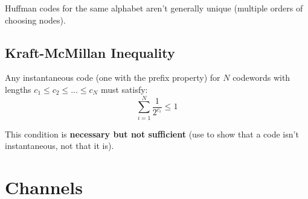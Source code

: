 \documentclass[a4paper, 11pt]{article}
\begin{document}
{{        Huffman codes for the same alphabet aren't generally unique (multiple orders of choosing nodes).
    }
    \subsection*{Kraft-McMillan Inequality}
    {
        Any instantaneous code (one with the prefix property) for \(N\) codewords with lengths \(c_1 \leq c_2 \leq ... \leq c_N\) must satisfy:
        \[\sum_{i=1}^N{\frac{1}{2^{c_i}}} \leq 1\]

        This condition is \textbf{necessary but not sufficient} (use to show that a code isn't instantaneous, not that it is).
    }
}
\section*{Channels}
\end{document}
